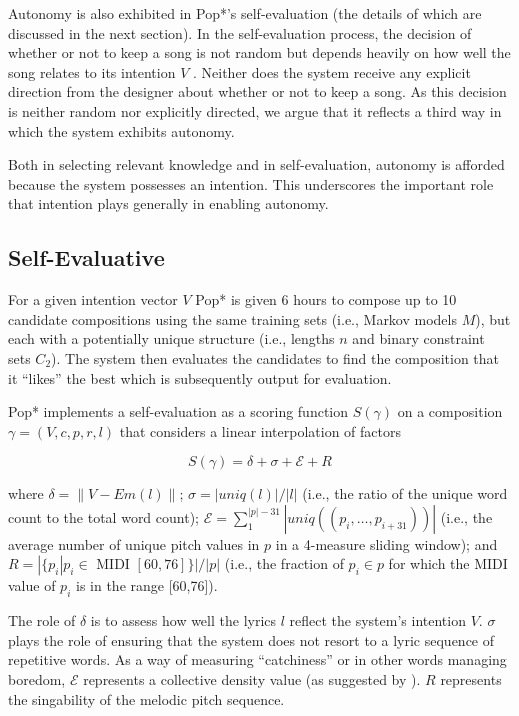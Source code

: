 \documentclass[phd,electronic,oneside,twosidetoc,letterpaper,chaptercenter,parttop,lol,lof,lot]{byumsphd}
\begin{document}
Autonomy is also exhibited in Pop*'s self-evaluation (the details of which are discussed in the next section). In the self-evaluation process, the decision of whether or not to keep a song is not random but depends heavily on how well the song relates to its intention $V$%
. Neither does the system receive any explicit direction from the designer about whether or not to keep a song. As this decision is neither random nor explicitly directed, we argue that it reflects a third way in which the system exhibits autonomy.

Both in selecting relevant knowledge and in self-evaluation, autonomy is afforded because the system possesses an intention. This underscores the important role that intention plays generally in enabling autonomy.

\subsection{Self-Evaluative}

For a given intention vector $V$ Pop* is given 6 hours to compose up to 10 candidate compositions using the same training sets (i.e., Markov models $M$), but each with a potentially unique structure (i.e., lengths $n$ and binary constraint sets $C_2$). The system then evaluates the candidates to find the composition that it ``likes'' the best which is subsequently output for evaluation.

Pop* implements a self-evaluation as a scoring function $S(\gamma)$ on a composition $\gamma=(V,c,p,r,l)$ that considers a linear interpolation of factors

\[
S(\gamma) = \delta + \sigma + {\mathcal{E}} + R
\]

\noindent where $\delta=\lVert V - Em(l)\rVert$; $\sigma=|uniq(l)|/|l|$ (i.e., the ratio of the unique word count to the total word count); ${\mathcal{E}}=\sum_1^{|p|-31} |uniq((p_i,\dots,p_{i+31}))|$ (i.e., the average number of unique pitch values in $p$ in a 4-measure sliding window); and $R = |\{p_i| p_i \in$ MIDI $[60,76]\}|/|p|$ (i.e., the fraction of $p_i\in p$ for which the MIDI value of $p_i$ is in the range [60,76]).

The role of $\delta$ is to assess how well the lyrics $l$ reflect the system's intention $V$. $\sigma$ plays the role of ensuring that the system does not resort to a lyric sequence of repetitive words. As a way of measuring ``catchiness'' or in other words managing boredom, ${\mathcal{E}}$ represents a collective density value (as suggested by \cite{eigenfeldt2017distributed}). $R$ represents the singability of the melodic pitch sequence.
 
\end{document}
